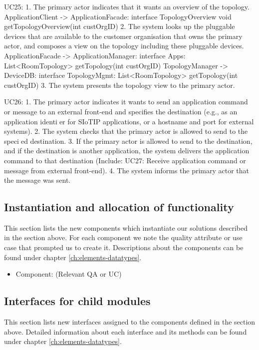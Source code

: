         UC25:
            1. The primary actor indicates that it wants an overview of the topology.
                ApplicationClient -> ApplicationFacade: interface TopologyOverview
                                                               void getTopologyOverview(int custOrgID)
            2. The system looks up the pluggable devices that are available to the customer organisation
           that owns the primary actor, and composes a view on the topology including these pluggable devices.
                ApplicationFacade -> ApplicationManager: interface Apps: List<RoomTopology> getTopology(int custOrgID)
                TopologyManager -> DeviceDB: interface TopologyMgmt: List<RoomTopology> getTopology(int custOrgID)
            3. The system presents the topology view to the primary actor.

        UC26:
            1. The primary actor indicates it wants to send an application command or message to an external
                front-end and specifies the destination (e.g., as an application identier for SIoTIP applications,
                or a hostname and port for external systems).
            2. The system checks that the primary actor is allowed to send to the specied destination.
            3. If the primary actor is allowed to send to the destination, and if the destination is another
                application, the system delivers the application command to that destination (Include: UC27:
                Receive application command or message from external front-end).
            4. The system informs the primary actor that the message was sent.


\subsection{Instantiation and allocation of functionality}
    This section lists the new components which instantiate our solutions
    described in the section above. For each component we note the quality
    attribute or use case that prompted us to create it. Descriptions about
    the components can be found under chapter \ref{ch:elements-datatypes}. \\

    \begin{itemize}
        \item Component: (Relevant QA or UC)
    \end{itemize}


\subsection{Interfaces for child modules}
    This section lists new interfaces assigned to the components defined
    in the section above. Detailed information about each interface and
    its methods can be found under chapter \ref{ch:elements-datatypes}. \\

